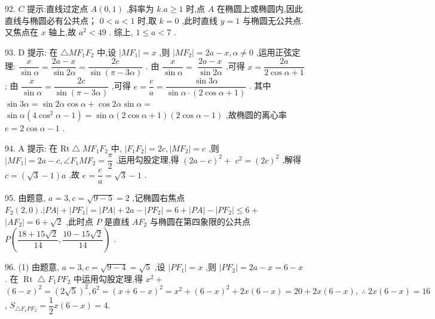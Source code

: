 92. $C$ 提示:直线过定点 $A\left( {0,1}\right)$ ,斜率为 $k.a \geq  1$ 时,点 $A$ 在椭圆上或椭圆内,因此直线与椭圆必有公共点； $0 < a < 1$ 时,取 $k = 0$ ,此时直线 $y = 1$ 与椭圆无公共点. 又焦点在 $x$ 轴上,故 ${a}^{2} < {49}$ . 综上, $1 \leq  a < 7$ .

93. D 提示: 在 $\bigtriangleup M{F}_{1}{F}_{2}$ 中,设 $\left| {M{F}_{1}}\right|  = x$ ,则 $\left| {M{F}_{2}}\right|  = {2a} - x,\alpha  \neq  0$ ,运用正弦定理: $\dfrac{x}{\sin \alpha } = \dfrac{{2a} - x}{\sin {2\alpha }} = \dfrac{2c}{\sin \left( {\pi  - {3\alpha }}\right) }$ . 由 $\dfrac{x}{\sin \alpha } =$  $\dfrac{{2a} - x}{\sin {2\alpha }}$ ,可得 $x = \dfrac{2a}{2\cos \alpha  + 1}$ ; 由 $\dfrac{x}{\sin \alpha } = \dfrac{2c}{\sin \left( {\pi  - {3\alpha }}\right) }$ ,可得 $e = \dfrac{c}{a} = \dfrac{\sin {3\alpha }}{\sin \alpha  \cdot  \left( {2\cos \alpha  + 1}\right) }$ . 其中 $\sin {3\alpha } = \sin {2\alpha }\cos \alpha  + \cos {2\alpha }\sin \alpha  =$  $\sin \alpha \left( {4{\cos }^{2}\alpha  - 1}\right)  = \sin \alpha \left( {2\cos \alpha  + 1}\right) \left( {2\cos \alpha  - 1}\right)$ ,故椭圆的离心率 $e = 2\cos \alpha  - 1$ .

94. A 提示: 在 $\mathrm{{Rt}} \bigtriangleup  M{F}_{1}{F}_{2}$ 中, $\left| {{F}_{1}{F}_{2}}\right|  = {2c},\left| {M{F}_{2}}\right|  = c$ ,则 $\left| {M{F}_{1}}\right|  = {2a} - c,\angle {F}_{1}M{F}_{2} = \dfrac{\pi }{2}$ ,运用勾股定理,得 ${\left( 2a - c\right) }^{2} +$  ${c}^{2} = {\left( 2c\right) }^{2}$ ,解得 $c = \left( {\sqrt{3} - 1}\right) a$ ,故 $e = \dfrac{c}{a} = \sqrt{3} - 1$ .

95. 由题意, $a = 3,c = \sqrt{9 - 5} = 2$ ,记椭圆右焦点 ${F}_{2}\left( {2,0}\right) .\left| {PA}\right|  + \left| {P{F}_{1}}\right|  = \left| {PA}\right|  + {2a} - \left| {P{F}_{2}}\right|  = 6 + \left| {PA}\right|  - \left| {P{F}_{2}}\right|  \leq  6 +$  $\left| {A{F}_{2}}\right|  = 6 + \sqrt{2}$ ,此时点 $P$ 是直线 $A{F}_{2}$ 与椭圆在第四象限的公共点 $P\left( {\dfrac{{18} + {15}\sqrt{2}}{14},\dfrac{{10} - {15}\sqrt{2}}{14}}\right)$ .

96. (1) 由题意, $a = 3,c = \sqrt{9 - 4} = \sqrt{5}$ ,设 $\left| {P{F}_{1}}\right|  = x$ ,则 $\left| {P{F}_{2}}\right|  = {2a} - x = 6 - x$ . 在 $\operatorname{Rt} \bigtriangleup  {F}_{1}P{F}_{2}$ 中运用勾股定理,得 ${x}^{2} +$  ${\left( 6 - x\right) }^{2} = {\left( 2\sqrt{5}\right) }^{2},{6}^{2} = {\left( x + 6 - x\right) }^{2} = {x}^{2} + {\left( 6 - x\right) }^{2} + {2x}\left( {6 - x}\right)  = {20} + {2x}\left( {6 - x}\right) ,\;\therefore \;{2x}\left( {6 - x}\right)  = {16}$ , ${S}_{\bigtriangleup {F}_{1}P{F}_{2}} = \dfrac{1}{2}x\left( {6 - x}\right)  = 4.$

